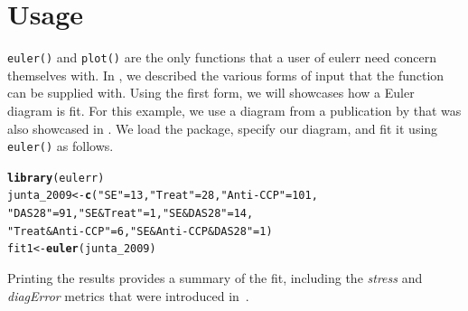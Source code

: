 \documentclass[
  oneside,
  openany,
  numbers=noendperiod,
  parskip=half,
  bibliography=totoc
]{scrbook}\usepackage[]{graphicx}\usepackage{xcolor}
\makeatletter
\newcommand{\hlnum}[1]{\textcolor[rgb]{0.686,0.059,0.569}{#1}}%
\newcommand{\hlstr}[1]{\textcolor[rgb]{0.192,0.494,0.8}{#1}}%
\newcommand{\hlstd}[1]{\textcolor[rgb]{0.345,0.345,0.345}{#1}}%
\newcommand{\hlkwb}[1]{\textcolor[rgb]{0.69,0.353,0.396}{#1}}%
\newcommand{\hlkwd}[1]{\textcolor[rgb]{0.737,0.353,0.396}{\textbf{#1}}}%
\newenvironment{kframe}{%
 \def\at@end@of@kframe{}%
 \ifinner\ifhmode%
  \def\at@end@of@kframe{\end{minipage}}%
  \begin{minipage}{\columnwidth}%
 \fi\fi%
 \def\FrameCommand##1{\hskip\@totalleftmargin \hskip-\fboxsep
 \colorbox{shadecolor}{##1}\hskip-\fboxsep
     \hskip-\linewidth \hskip-\@totalleftmargin \hskip\columnwidth}%
 \MakeFramed {\advance\hsize-\width
   \@totalleftmargin\z@ \linewidth\hsize
   \@setminipage}}%
 {\par\unskip\endMakeFramed%
 \at@end@of@kframe}
\newenvironment{knitrout}{}{} %
\newcommand{\pkg}[1]{{\fontseries{b}\selectfont #1}}
\newcommand{\code}[1]{\texttt{#1}}
\makeatother
\begin{document}
\chapter{Usage}\label{ch:usage}

\code{euler()} and \code{plot()} are the only functions that a user of
\pkg{eulerr} need concern themselves with. In , we described
the various forms of input that the function can be supplied with. Using the
first form, we will showcases how a Euler diagram is fit. For this example,
we use a diagram from a publication by \citet{junta_2009} that was also
showcased in \citet{wilkinson_2012}. We load the package,
specify our diagram, and fit it using \code{euler()} as follows.

\begin{knitrout}\small
{}\color{fgcolor}\begin{kframe}
\begin{alltt}
\hlkwd{library}\hlstd{(eulerr)}
\hlstd{junta_2009} \hlkwb{<-} \hlkwd{c}\hlstd{(}\hlstr{"SE"} \hlstd{=} \hlnum{13}\hlstd{,} \hlstr{"Treat"} \hlstd{=} \hlnum{28}\hlstd{,} \hlstr{"Anti-CCP"} \hlstd{=} \hlnum{101}\hlstd{,}
                \hlstr{"DAS28"} \hlstd{=} \hlnum{91}\hlstd{,} \hlstr{"SE&Treat"} \hlstd{=} \hlnum{1}\hlstd{,} \hlstr{"SE&DAS28"} \hlstd{=} \hlnum{14}\hlstd{,}
                \hlstr{"Treat&Anti-CCP"} \hlstd{=} \hlnum{6}\hlstd{,} \hlstr{"SE&Anti-CCP&DAS28"} \hlstd{=} \hlnum{1}\hlstd{)}
\hlstd{fit1} \hlkwb{<-} \hlkwd{euler}\hlstd{(junta_2009)}
\end{alltt}
\end{kframe}
\end{knitrout}

Printing the results provides a summary of the fit, including the \emph{stress}
and \emph{diagError} metrics that were introduced in~.
\end{document}
